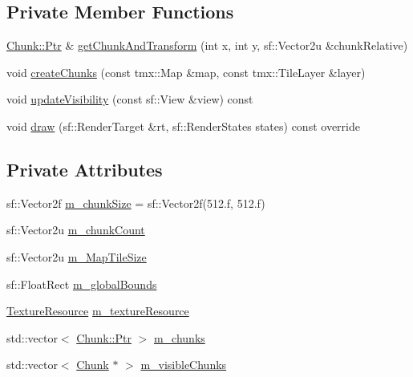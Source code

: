 \subsection*{Private Member Functions}
\begin{DoxyCompactItemize}
\item 
\hyperlink{classMapLayer_1_1Chunk_ab1df4d3621c5d9f83c2edb46d0744078}{Chunk\+::\+Ptr} \& \hyperlink{classMapLayer_a5686d500c087caa0c096c965d5d36574}{get\+Chunk\+And\+Transform} (int x, int y, sf\+::\+Vector2u \&chunk\+Relative)
\item 
void \hyperlink{classMapLayer_a853b2091fa76fabe4446797e0a01809a}{create\+Chunks} (const tmx\+::\+Map \&map, const tmx\+::\+Tile\+Layer \&layer)
\item 
void \hyperlink{classMapLayer_a6602d1d89676fa73ace9934f7b77c0c5}{update\+Visibility} (const sf\+::\+View \&view) const
\item 
void \hyperlink{classMapLayer_a6a43405b98f14c3efbe02395c466c1e6}{draw} (sf\+::\+Render\+Target \&rt, sf\+::\+Render\+States states) const override
\end{DoxyCompactItemize}
\subsection*{Private Attributes}
\begin{DoxyCompactItemize}
\item 
sf\+::\+Vector2f \hyperlink{classMapLayer_af8d36b6ff112417b9d4f73a52e8859ae}{m\+\_\+chunk\+Size} = sf\+::\+Vector2f(512.f, 512.f)
\item 
sf\+::\+Vector2u \hyperlink{classMapLayer_ae816f79d9d81eb7e9e207c00bbf41218}{m\+\_\+chunk\+Count}
\item 
sf\+::\+Vector2u \hyperlink{classMapLayer_a9863689eb080d27e7a99dea7c20aee41}{m\+\_\+\+Map\+Tile\+Size}
\item 
sf\+::\+Float\+Rect \hyperlink{classMapLayer_a1e1ca5c4bedf393c1c85e2ced3bbf50a}{m\+\_\+global\+Bounds}
\item 
\hyperlink{classMapLayer_a64011087426e436e3cb8374570378d68}{Texture\+Resource} \hyperlink{classMapLayer_ad7cade67df5e55b3c6a960476e6d2cb9}{m\+\_\+texture\+Resource}
\item 
std\+::vector$<$ \hyperlink{classMapLayer_1_1Chunk_ab1df4d3621c5d9f83c2edb46d0744078}{Chunk\+::\+Ptr} $>$ \hyperlink{classMapLayer_a07e8acdbdfc63584a2b9276ca499ad70}{m\+\_\+chunks}
\item 
std\+::vector$<$ \hyperlink{classMapLayer_1_1Chunk}{Chunk} $\ast$ $>$ \hyperlink{classMapLayer_a74941b5479affea58ea8a3068770d430}{m\+\_\+visible\+Chunks}
\end{DoxyCompactItemize}


